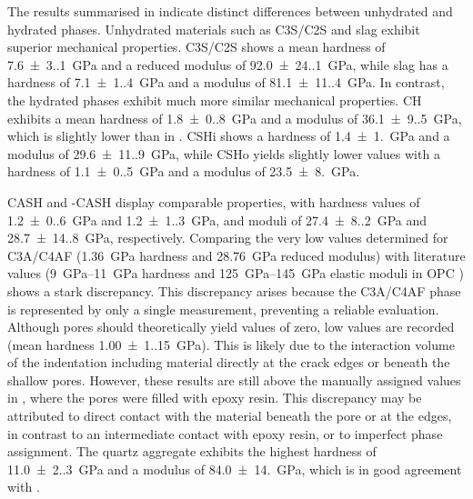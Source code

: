 The results summarised in  indicate distinct differences between unhydrated and hydrated phases.
Unhydrated materials such as \ac{C3S}/\ac{C2S} and slag exhibit superior mechanical properties.
\ac{C3S}/\ac{C2S} shows a mean hardness of \qty{7.6(3.1)}{\giga\pascal} and a reduced modulus of \qty{92.0(24.1)}{\giga\pascal}, while slag has a hardness of \qty{7.1(1.4)}{\giga\pascal} and a modulus of \qty{81.1(11.4)}{\giga\pascal}.
In contrast, the hydrated phases exhibit much more similar mechanical properties.
\ac{CH} exhibits a mean hardness of \qty{1.8(0.8)}{\giga\pascal} and a modulus of \qty{36.1(9.5)}{\giga\pascal}, which is slightly lower than in \cite{li.2025,li.2026}.
\ac{CSHi} shows a hardness of \qty{1.4(1.0)}{\giga\pascal} and a modulus of \qty{29.6(11.9)}{\giga\pascal}, while \ac{CSHo} yields slightly lower values with a hardness of \qty{1.1(0.5)}{\giga\pascal} and a modulus of \qty{23.5(8.0)}{\giga\pascal}.

\ac{CASH} and -\ac{CASH} display comparable properties, with hardness values of \qty{1.2(0.6)}{\giga\pascal} and \qty{1.2(1.3)}{\giga\pascal}, and moduli of \qty{27.4(8.2)}{\giga\pascal} and \qty{28.7(14.8)}{\giga\pascal}, respectively.
Comparing the very low values determined for \ac{C3A}/\ac{C4AF} (\qty{1.36}{\giga\pascal} hardness and \qty{28.76}{\giga\pascal} reduced modulus) with literature values (\qtyrange{9}{11}{\giga\pascal} hardness and \qtyrange{125}{145}{\giga\pascal} elastic moduli in \ac{OPC} \cite{velez.2001}) shows a stark discrepancy.
This discrepancy arises because the \ac{C3A}/\ac{C4AF} phase is represented by only a single measurement, preventing a reliable evaluation.
Although pores should theoretically yield values of zero, low values are recorded (mean hardness \qty{1.00(1.15)}{\giga\pascal}).
This is likely due to the interaction volume of the indentation including material directly at the crack edges or beneath the shallow pores.
However, these results are still above the manually assigned values in \cite{li.2025, li.2026}, where the pores were filled with epoxy resin.
This discrepancy may be attributed to direct contact with the material beneath the pore or at the edges, in contrast to an intermediate contact with epoxy resin, or to imperfect phase assignment.
The quartz aggregate exhibits the highest hardness of \qty{11.0(2.3)}{\giga\pascal} and a modulus of \qty{84.0(14.0)}{\giga\pascal}, which is in good agreement with \cite{li.2025, li.2026}.

